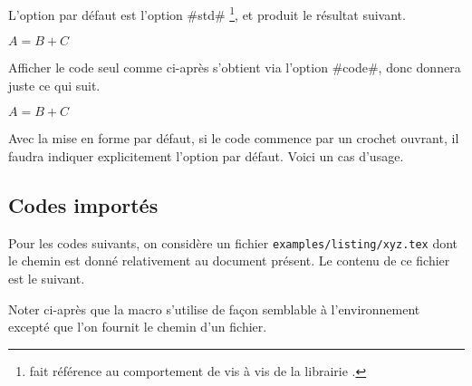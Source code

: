\documentclass[10pt, a4paper]{article}
\begin{document}
\begin{bdocexa}[À la suite]
    L'option par défaut est l'option \bdocinlatex#std#
    \footnote{
         fait référence au comportement  de  vis à vis de la librairie .
    },
    et  produit le résultat suivant.

    \begin{bdoclatex}
        $A = B + C$
    \end{bdoclatex}
\end{bdocexa}




\begin{bdocexa}
    Afficher le code seul comme ci-après s'obtient via l'option \bdocinlatex#code#, donc  donnera juste ce qui suit.

    \begin{bdoclatex}[code]
        $A = B + C$
    \end{bdoclatex}
\end{bdocexa}




\begin{bdocwarn}
    Avec la mise en forme par défaut, si le code commence par un crochet ouvrant, il faudra indiquer explicitement l'option par défaut. Voici un cas d'usage.

\end{bdocwarn}



\subsection{Codes importés}

Pour les codes suivants, on considère un fichier \verb+examples/listing/xyz.tex+ dont le chemin est donné relativement au document présent.
Le contenu de ce fichier est le suivant.


\medskip

Noter ci-après que la macro  s'utilise de façon semblable à l'environnement  excepté que l'on fournit le chemin d'un fichier.
\end{document}
